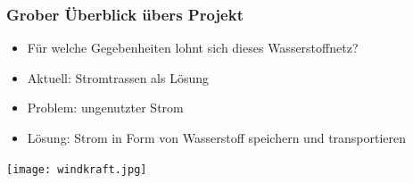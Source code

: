 \documentclass[aspectratio=169,t]{beamer}
\begin{document}
	\begin{frame}
		\frametitle{Grober Überblick übers Projekt}
		\vspace*{-4mm}
		\begin{minipage}{1\linewidth}
			\begin{minipage}{.5\linewidth}
				\vspace*{-12mm}
				
				\begin{itemize}
					
					\item Für welche Gegebenheiten lohnt sich dieses Wasserstoffnetz?
						\vspace*{2mm}
					
					\item Aktuell: Stromtrassen als Lösung
						\vspace*{2mm}
					
					\item Problem: ungenutzter Strom 
						\vspace*{2mm}
					
					\item Lösung: Strom in Form von Wasserstoff speichern und transportieren 
					
					
				\end{itemize}
			\end{minipage}
			\hfill
			\begin{minipage}{.5\linewidth}
				\centering
				\texttt{[image: windkraft.jpg]}
				
			\end{minipage}
		\end{minipage}	
		
		
		
	\end{frame}
	
	
\end{document}
